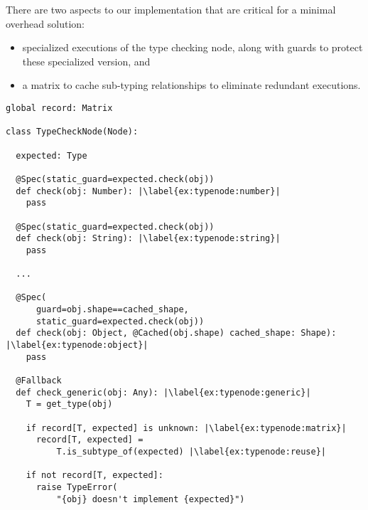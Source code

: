 There are two aspects to our implementation that are critical for a minimal overhead solution:

\begin{itemize}
  \item specialized executions of the type checking node, along with guards to protect these specialized version, and
  \item a matrix to cache sub-typing relationships to eliminate redundant executions.
\end{itemize}
 

\begin{lstlisting}[label={ex:typenode},escapechar=|,caption={An illustration of the type checking node that support type checking},float,floatplacement=htbp,columns=flexible,morekeywords={global}]
global record: Matrix

class TypeCheckNode(Node):

  expected: Type

  @Spec(static_guard=expected.check(obj))
  def check(obj: Number): |\label{ex:typenode:number}|
    pass

  @Spec(static_guard=expected.check(obj))
  def check(obj: String): |\label{ex:typenode:string}|
    pass

  ...

  @Spec(
      guard=obj.shape==cached_shape,
      static_guard=expected.check(obj))
  def check(obj: Object, @Cached(obj.shape) cached_shape: Shape): |\label{ex:typenode:object}|
    pass
  
  @Fallback
  def check_generic(obj: Any): |\label{ex:typenode:generic}|
    T = get_type(obj)
    
    if record[T, expected] is unknown: |\label{ex:typenode:matrix}|
      record[T, expected] =
          T.is_subtype_of(expected) |\label{ex:typenode:reuse}|

    if not record[T, expected]:
      raise TypeError(
          "{obj} doesn't implement {expected}")
\end{lstlisting}

